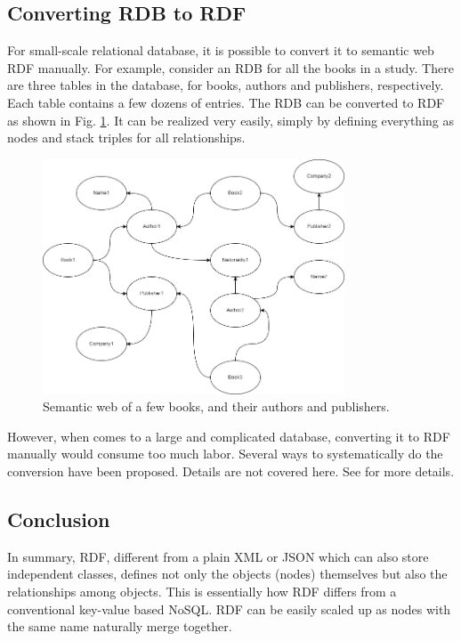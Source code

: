 \subsection{Converting RDB to RDF}

For small-scale relational database, it is possible to convert it to semantic web RDF manually. For example, consider an RDB for all the books in a study. There are three tables in the database, for books, authors and publishers, respectively. Each table contains a few dozens of entries. The RDB can be converted to RDF as shown in Fig. \ref{fig:bookexp}. It can be realized very easily, simply by defining everything as nodes and stack triples for all relationships. 
\begin{figure}[htbp]
	\centering
	\includegraphics[width=0.8\textwidth]{./chapters/ch-semanticwebarchitecture/figures/bookexp.png}
	\caption{Semantic web of a few books, and their authors and publishers.}
	\label{fig:bookexp}
\end{figure}

However, when comes to a large and complicated database, converting it to RDF manually would consume too much labor. Several ways to systematically do the conversion have been proposed. Details are not covered here. See \cite{michel2014survey} for more details.

\subsection{Conclusion}

In summary, RDF, different from a plain XML or JSON which can also store independent classes, defines not only the objects (nodes) themselves but also the relationships among objects. This is essentially how RDF differs from a conventional key-value based NoSQL. RDF can be easily scaled up as nodes with the same name naturally merge together.

